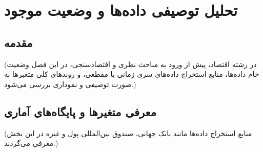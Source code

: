 \chapter{تحلیل توصیفی داده‌ها و وضعیت موجود}

\section{مقدمه}
(در رشته اقتصاد، پیش از ورود به مباحث نظری و اقتصادسنجی، در این فصل وضعیت خام داده‌ها، منابع استخراج داده‌های سری زمانی یا مقطعی، و روندهای کلی متغیرها به صورت توصیفی و نموداری بررسی می‌شود.)

\section{معرفی متغیرها و پایگاه‌های آماری}
(منابع استخراج داده‌ها مانند بانک جهانی، صندوق بین‌المللی پول و غیره در این بخش معرفی می‌گردند.)